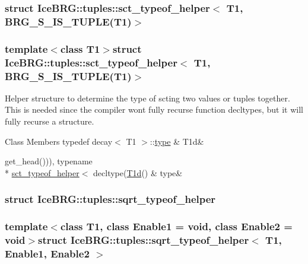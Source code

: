 \subsubsection{struct Ice\+B\+R\+G\+:\+:tuples\+:\+:sct\+\_\+typeof\+\_\+helper$<$ T1, B\+R\+G\+\_\+\+S\+\_\+\+I\+S\+\_\+\+T\+U\+P\+L\+E(T1)$>$}
\subsubsection*{template$<$class T1$>$struct Ice\+B\+R\+G\+::tuples\+::sct\+\_\+typeof\+\_\+helper$<$ T1, B\+R\+G\+\_\+\+S\+\_\+\+I\+S\+\_\+\+T\+U\+P\+L\+E(\+T1)$>$}

Helper structure to determine the type of scting two values or tuples together. This is needed since the compiler won\textquotesingle{}t fully recurse function decltypes, but it will fully recurse a structure. \begin{DoxyFields}{Class Members}
\hypertarget{namespaceIceBRG_1_1tuples_aee11156a089e68658dbf646cee662dd9}{}typedef decay$<$ T1 $>$\+::\hyperlink{namespaceIceBRG_1_1tuples_ae8d44ac1b67db98010ff993be194c629}{type}\label{namespaceIceBRG_1_1tuples_aee11156a089e68658dbf646cee662dd9}
&
T1d&
\\
\hline

\hypertarget{namespaceIceBRG_1_1tuples_ae8d44ac1b67db98010ff993be194c629}{}get\+\_\+head())), typename \\*
\hyperlink{namespaceIceBRG_1_1tuples_structIceBRG_1_1tuples_1_1sct__typeof__helper}{sct\+\_\+typeof\+\_\+helper}$<$ decltype(\hyperlink{namespaceIceBRG_1_1tuples_aee11156a089e68658dbf646cee662dd9}{T1d}()\label{namespaceIceBRG_1_1tuples_ae8d44ac1b67db98010ff993be194c629}
&
type&
\\
\hline

\end{DoxyFields}
\label{structIceBRG_1_1tuples_1_1sqrt__typeof__helper}
\hypertarget{namespaceIceBRG_1_1tuples_structIceBRG_1_1tuples_1_1sqrt__typeof__helper}{}
\subsubsection{struct Ice\+B\+R\+G\+:\+:tuples\+:\+:sqrt\+\_\+typeof\+\_\+helper}
\subsubsection*{template$<$class T1, class Enable1 = void, class Enable2 = void$>$struct Ice\+B\+R\+G\+::tuples\+::sqrt\+\_\+typeof\+\_\+helper$<$ T1, Enable1, Enable2 $>$}

